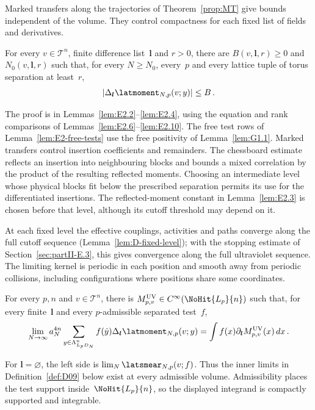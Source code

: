 Marked transfers along the trajectories of Theorem~\ref{prop:MT} give bounds independent of the volume. They control compactness for each fixed list of fields and derivatives.
\begin{proposition}\label{prop:UB}
For every $v\in\mathcal T^n$, finite difference list~$\boldsymbol l$ and $r>0$, there are $B(v,\boldsymbol l,r)\ge0$ and $N_0(v,\boldsymbol l,r)$ such that, for every $N\ge N_0$, every~$p$ and every lattice tuple of torus separation at least~$r$,
\begin{equation*}
|\Delta_{\boldsymbol l}\latmoment_{N,p}(v;y)|\le B\,.
\end{equation*}
\end{proposition}
The proof is in Lemmas~\ref{lem:E2.2}--\ref{lem:E2.4}, using the equation and rank comparisons of Lemmas~\ref{lem:E2.6}--\ref{lem:E2.10}. The free test rows of Lemma~\ref{lem:E2-free-tests} use the free positivity of Lemma~\ref{lem:G1.1}. Marked transfers control insertion coefficients and remainders. The chessboard estimate reflects an insertion into neighbouring blocks and bounds a mixed correlation by the product of the resulting reflected moments. Choosing an intermediate level whose physical blocks fit below the prescribed separation permits its use for the differentiated insertions. The reflected-moment constant in Lemma~\ref{lem:E2.3} is chosen before that level, although its cutoff threshold may depend on it.

At each fixed level the effective couplings, activities and paths converge along the full cutoff sequence (Lemma~\ref{lem:D-fixed-level}); with the stopping estimate of Section~\ref{sec:partII-E.3}, this gives convergence along the full ultraviolet sequence. The limiting kernel is periodic in each position and smooth away from periodic collisions, including configurations where positions share some coordinates.
\begin{theorem}\label{prop:UV}\label{thm:UV}
For every $p,n$ and $v\in\mathcal T^n$, there is $M^{\rm UV}_{p,v}\in C^\infty(\NoHit{L_p}{n})$ such that, for every finite~$\boldsymbol l$ and every $p$-admissible separated test~$f$,
\begin{equation*}
\lim_{N\to\infty}a_N^{4n}\sum_{y\in\Lambda_{L_pD_N}^n}f(\hat y)\Delta_{\boldsymbol l}\latmoment_{N,p}(v;y)
=\int f(x)\partial_{\boldsymbol l}M^{\rm UV}_{p,v}(x)\,dx\,.
\end{equation*}
\end{theorem}
For $\boldsymbol l=\varnothing$, the left side is $\lim_N\latsmear_{N,p}(v;f)$. Thus the inner limits in Definition~\ref{def:D09} below exist at every admissible volume. Admissibility places the test support inside~$\NoHit{L_p}{n}$, so the displayed integrand is compactly supported and integrable.

